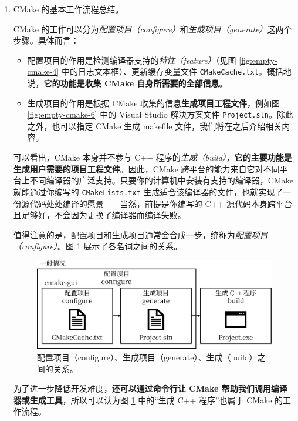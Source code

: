 \begin{enumerate}
	\item CMake 的基本工作流程总结。

	CMake 的工作可以分为\emph{配置项目（configure）}和\emph{生成项目（generate）}这两个步骤。具体而言：

	\begin{itemize}
		\item 配置项目的作用是检测编译器支持的\emph{特性（feature）}（见图 \ref{fig:empty-cmake-4} 中的日志文本框）、更新缓存变量文件 \lstinline[language={}]{CMakeCache.txt}。概括地说，\textbf{它的功能是收集 CMake 自身所需要的全部信息}。

		\item 生成项目的作用是根据 CMake 收集的信息\textbf{生成项目工程文件}，例如图 \ref{fig:empty-cmake-6} 中的 Visual Studio 解决方案文件 \lstinline[language={}]{Project.sln}。除此之外，也可以指定 CMake 生成 makefile 文件，我们将在之后介绍相关内容。 %
	\end{itemize}

	可以看出，CMake 本身并不参与 C++ 程序的\emph{生成（build）}，\textbf{它的主要功能是生成用户需要的项目工程文件}。因此，CMake 跨平台的能力来自它对不同平台上不同编译器的广泛支持。只要你的计算机中安装有支持的编译器，CMake 就能通过你编写的 \lstinline[language={}]{CMakeLists.txt} 生成适合该编译器的文件，也就实现了一份源代码处处编译的愿景——当然，前提是你编写的 C++ 源代码本身跨平台且足够好，不会因为更换了编译器而编译失败。

	值得注意的是，配置项目和生成项目通常会合成一步，统称为\emph{配置项目（configure）}。图 \ref{fig:configure} 展示了各名词之间的关系。

	\begin{figure}[H]
		\centering
		\includegraphics[scale=0.15]{assets/configure}
		\caption{配置项目（configure）、生成项目（generate）、生成（build）之间的关系。}
		\label{fig:configure}
	\end{figure}

	为了进一步降低开发难度，\textbf{还可以通过命令行让 CMake 帮助我们调用编译器或生成工具}，所以可以认为图 \ref{fig:configure} 中的“生成 C++ 程序”也属于 CMake 的工作流程。


\end{enumerate}
